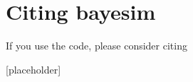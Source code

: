 \documentclass[letterpaper,10pt,english]{sphinxmanual}
\begin{document}
\chapter{Citing bayesim}
\label{\detokenize{citingbayesim:citing-bayesim}}\label{\detokenize{citingbayesim::doc}}
If you use the code, please consider citing

{[}placeholder{]}

\noindent{}



\renewcommand{\indexname}{Index}
\printindex
\end{document}
